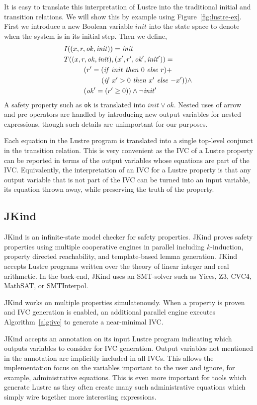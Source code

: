 It is easy to translate this interpretation of Lustre into the
traditional initial and transition relations. We will show this by
example using Figure~\ref{fig:lustre-ex}. First we introduce a new Boolean
variable $init$ into the state space to denote when the system is in
its initial step. Then we define,
\begin{align*}
  &I((x, r, \mathit{ok}, \mathit{init})) = \mathit{init} \\
  &T((x, r, \mathit{ok}, \mathit{init}), (x', r', \mathit{ok'},
  \mathit{init'})) = \\
  &\hspace{1cm} (r' = (\mathit{if}\ {init}\ \mathit{then}\ {0}\ \mathit{else}\ {r}) +~ \\
  &\hspace{1cm} \phantom{(r' =\,\,}(\mathit{if}\ {x'>0}\ \mathit{then}\ {x'}\ \mathit{else}\ {-x'})) \land~\\
  &\hspace{1cm} (\mathit{ok'} = (r' \geq 0)) \land \neg\mathit{init'}
\end{align*}
A safety property such as {\tt ok} is translated into $\mathit{init}
\lor \mathit{ok}$. Nested uses of arrow and pre operators are handled
by introducing new output variables for nested expressions, though
such details are unimportant for our purposes.

Each equation in the Lustre program is translated into a single
top-level conjunct in the transition relation. This is very convenient
as the IVC of a Lustre property can be reported in terms of the output
variables whose equations are part of the IVC. Equivalently, the
interpretation of an IVC for a Lustre property is that any output
variable that is not part of the IVC can be turned into an input
variable, its equation thrown away, while preserving the truth of the
property.

\subsection{JKind}

JKind is an infinite-state model checker for safety properties. JKind
proves safety properties using multiple cooperative engines in
parallel including $k$-induction, property directed reachability, and
template-based lemma generation. JKind accepts Lustre programs written
over the theory of linear integer and real arithmetic. In the back-end,
JKind uses an SMT-solver such as Yices, Z3, CVC4, MathSAT, or
SMTInterpol.

JKind works on multiple properties simulatenously. When a property is
proven and IVC generation is enabled, an additional parallel engine
executes Algorithm~\ref{alg:ivc} to generate a near-minimal IVC.

JKind accepts an annotation on its input Lustre program indicating
which outputs variables to consider for IVC generation. Output
variables not mentioned in the annotation are implicitly included in
all IVCs. This allows the implementation focus on the variables
important to the user and ignore, for example, administrative
equations. This is even more important for tools which generate Lustre
as they often create many such administrative equations which simply
wire together more interesting expressions.
